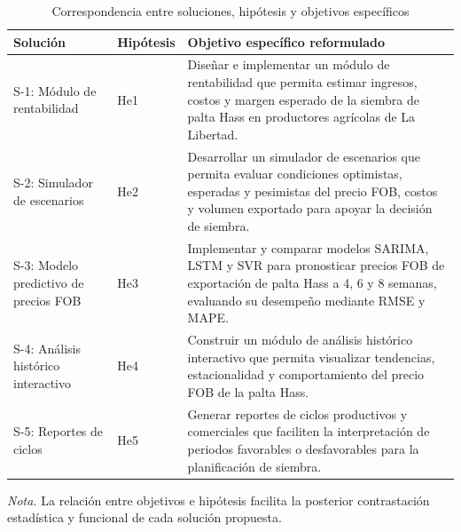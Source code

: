 \begin{table}[H]
\caption{Correspondencia entre soluciones, hip\'otesis y objetivos espec\'ificos}
\label{tab:correspondencia_objetivos}
\centering
\small
\begin{tabularx}{\textwidth}{p{2.5cm}p{2cm}X}
\toprule
\textbf{Soluci\'on} & \textbf{Hip\'otesis} & \textbf{Objetivo espec\'ifico reformulado} \\
\midrule
S-1: M\'odulo de rentabilidad & He1 & Dise\~nar e implementar un m\'odulo de rentabilidad que permita estimar ingresos, costos y margen esperado de la siembra de palta Hass en productores agr\'icolas de La Libertad. \\
S-2: Simulador de escenarios & He2 & Desarrollar un simulador de escenarios que permita evaluar condiciones optimistas, esperadas y pesimistas del precio FOB, costos y volumen exportado para apoyar la decisi\'on de siembra. \\
S-3: Modelo predictivo de precios FOB & He3 & Implementar y comparar modelos SARIMA, LSTM y SVR para pronosticar precios FOB de exportaci\'on de palta Hass a 4, 6 y 8 semanas, evaluando su desempe\~no mediante RMSE y MAPE. \\
S-4: An\'alisis hist\'orico interactivo & He4 & Construir un m\'odulo de an\'alisis hist\'orico interactivo que permita visualizar tendencias, estacionalidad y comportamiento del precio FOB de la palta Hass. \\
S-5: Reportes de ciclos & He5 & Generar reportes de ciclos productivos y comerciales que faciliten la interpretaci\'on de periodos favorables o desfavorables para la planificaci\'on de siembra. \\
\bottomrule
\end{tabularx}
\parbox{0.94\textwidth}{\small \textit{Nota.} La relaci\'on entre objetivos e hip\'otesis facilita la posterior contrastaci\'on estad\'istica y funcional de cada soluci\'on propuesta.}
\end{table}
